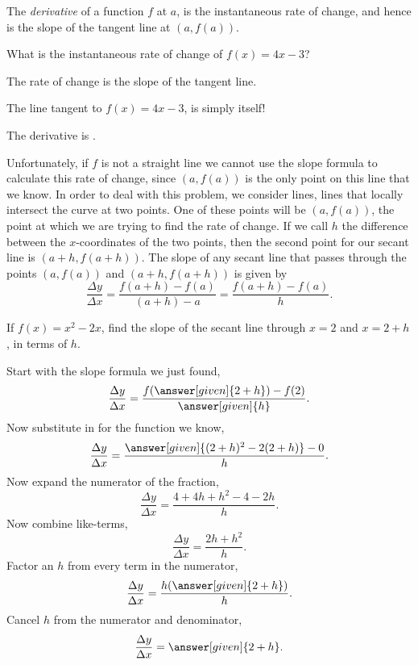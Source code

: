 \documentclass{ximera}
\begin{document}
The \textit{derivative} of a function $f$ at $a$, is the instantaneous
rate of change, and hence is the slope of the tangent line at $(a,f(a))$. 

\begin{question}
	What is the instantaneous rate of change of $f(x) = 4x-3$?
	\begin{hint}
		The rate of change is the slope of the tangent line.
	\end{hint}
	\begin{hint}
		The line tangent to $f(x) = 4x-3$, is simply itself!
	\end{hint}
	\begin{prompt}
		The derivative is .
	\end{prompt}
\end{question}


Unfortunately, if $f$ is not a straight line we cannot use the slope
formula to calculate this rate of change, since $(a,f(a))$ is the only
point on this line that we know.  In order to deal with this problem,
we consider  lines, lines that locally intersect the curve
at two points.  One of these points will be $(a, f(a))$, the point at
which we are trying to find the rate of change.  If we call $h$ the
difference between the $x$-coordinates of the two points, then the
second point for our secant line is $(a+h, f(a+h))$.  The slope of any
secant line that passes through the points $(a,f(a))$ and $(a+h,
f(a+h))$ is given by
\[
\frac{\Delta y}{\Delta x}=\frac{f(a+h) - f(a)}{(a+h) - a} =
\frac{f(a+h)-f(a)}{h}.
\]

\begin{example}
  If $f(x) = x^2-2x$, find the slope of the secant line through $x=2$ and $x=2+h$, in terms of $h$.
  \begin{explanation}
    Start with the slope formula we just found,
    \[
    \frac{\Delta y}{\Delta x} = \frac{f(\answer[given]{2+h})-f(2)}{\answer[given]{h}}.
    \]
    Now substitute in for the function we know,
    \[
    \frac{\Delta y}{\Delta x} = \frac{\answer[given]{(2+h)^2-2(2+h)} -0}{h}.
    \]
    Now expand the numerator of the fraction,
    \[
    \frac{\Delta y}{\Delta x} = \frac{4+4h+h^2-4-2h }{h}.
    \]
    Now combine like-terms,
    \[
    \frac{\Delta y}{\Delta x} = \frac{2h+h^2}{h}.
    \]
    Factor an $h$ from every term in the numerator,
    \[
    \frac{\Delta y}{\Delta x} = \frac{h(\answer[given]{2+h})}{h}.
    \]
    Cancel $h$ from the numerator and denominator,
    \[
    \frac{\Delta y}{\Delta x} = \answer[given]{2+h}. 
    \]
  \end{explanation}
\end{example}
\end{document}
